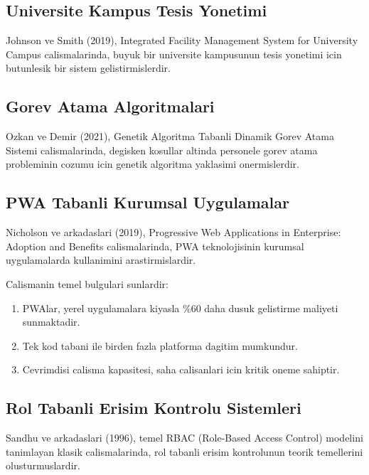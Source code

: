 \subsection{Universite Kampus Tesis Yonetimi}
\label{subsec:kampus-tesis}

Johnson ve Smith (2019), Integrated Facility Management System for 
University Campus calismalarinda, buyuk bir universite kampusunun 
tesis yonetimi icin butunlesik bir sistem gelistirmislerdir.

\subsection{Gorev Atama Algoritmalari}
\label{subsec:gorev-atama}

Ozkan ve Demir (2021), Genetik Algoritma Tabanli Dinamik Gorev 
Atama Sistemi calismalarinda, degisken kosullar altinda personele 
gorev atama probleminin cozumu icin genetik algoritma yaklasimi 
onermislerdir.

\subsection{PWA Tabanli Kurumsal Uygulamalar}
\label{subsec:pwa-kurumsal}

Nicholson ve arkadaslari (2019), Progressive Web Applications in 
Enterprise: Adoption and Benefits calismalarinda, PWA teknolojisinin 
kurumsal uygulamalarda kullanimini arastirmislardir.

Calismanin temel bulgulari sunlardir:
\begin{enumerate}
    \item PWAlar, yerel uygulamalara kiyasla \%60 daha dusuk 
    gelistirme maliyeti sunmaktadir.
    \item Tek kod tabani ile birden fazla platforma dagitim 
    mumkundur.
    \item Cevrimdisi calisma kapasitesi, saha calisanlari icin 
    kritik oneme sahiptir.
\end{enumerate}

\subsection{Rol Tabanli Erisim Kontrolu Sistemleri}
\label{subsec:rbac-sistemleri}

Sandhu ve arkadaslari (1996), temel RBAC (Role-Based Access Control) 
modelini tanimlayan klasik calismalarinda, rol tabanli erisim 
kontrolunun teorik temellerini olusturmuslardir.

